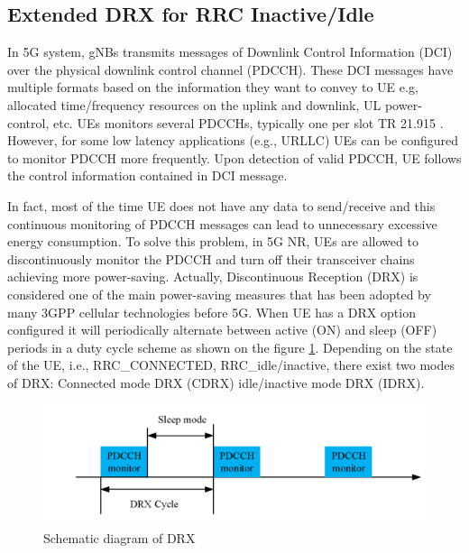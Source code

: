 \documentclass[conference]{IEEEtran}
\begin{document}
\subsection{Extended DRX for RRC Inactive/Idle}
\label{sec:5-1}

In 5G system, gNBs transmits messages of Downlink Control Information (DCI) over the physical downlink control channel (PDCCH). These DCI messages have multiple formats based on the information they want to convey to UE  e.g, allocated time/frequency resources on the uplink and downlink, UL power-control, etc. UEs monitors several PDCCHs, typically one per slot TR 21.915 \cite{3gpp.21.915}. However, for some low latency applications (e.g., URLLC) UEs can be configured to monitor PDCCH more frequently. Upon detection of valid PDCCH, UE follows the control information contained in DCI message.

In fact, most of the time UE does not have any data to send/receive and this continuous monitoring of PDCCH messages can lead to unnecessary excessive energy consumption. To solve this problem, in 5G NR, UEs are allowed to discontinuously monitor the PDCCH and turn off their transceiver chains achieving more power-saving. Actually, Discontinuous Reception (DRX) is considered one of the main power-saving measures that has been adopted by many 3GPP cellular technologies before 5G. When UE has a DRX option configured it will periodically alternate between active (ON) and sleep (OFF) periods in a duty cycle scheme as shown on the figure \ref{fig:5g-drx}. Depending on the state of the UE, i.e., RRC\_CONNECTED, RRC\_idle/inactive, there exist two modes of DRX: Connected mode DRX (CDRX) idle/inactive mode DRX (IDRX).

\begin{figure}
    \centering
    \includegraphics[width=\linewidth]{Pictures/Schematic diagram of DRX.png}
    \caption{Schematic diagram of DRX}
    \label{fig:5g-drx}
\end{figure}
\end{document}
